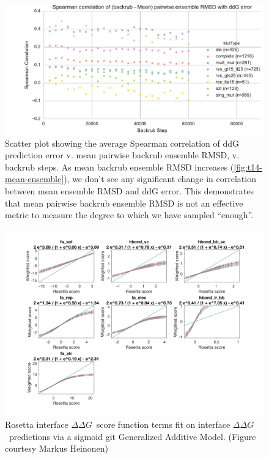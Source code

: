 \documentclass{article}
\newcommand\ddg{$\Delta\Delta G$}
\begin{document}
\begin{figure}
  \centering
  \includegraphics[width=\textwidth,keepaspectratio]{figures/t14-spear-corr.pdf}
  \caption[\ddg\ prediction error vs. ensemble RMSD]{
    Scatter plot showing the average Spearman correlation of ddG prediction error v. mean pairwise backrub ensemble RMSD, v. backrub steps.
    As mean backrub ensemble RMSD increases (\cref{fig:t14-mean-ensemble}), we don't see any significant change in correlation between mean ensemble RMSD and ddG error.
    This demonstrates that mean pairwise backrub ensemble RMSD is not an effective metric to measure the degree to which we have sampled ``enough''.
  } \label{fig:spear-corr-rmsd-error}
\end{figure}

\begin{figure}
  \centering
  \includegraphics[width=\textwidth,keepaspectratio]{figures/zemu-sigmoid2-tal-feats.png}
  \caption[Sigmoid fit Rosetta score function terms]{
    Rosetta interface \ddg\ score function terms fit on interface \ddg\ predictions via a sigmoid git Generalized Additive Model. (Figure courtesy Markus Heinonen)
  } \label{fig:t14-fits-feats}
\end{figure}
\end{document}

